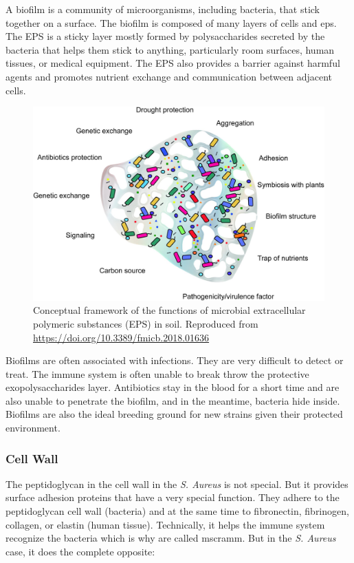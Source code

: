 
A biofilm is a community of microorganisms, including bacteria, that stick together on a surface. The biofilm is composed of many layers of cells and \gls{eps}. The EPS is a sticky layer mostly formed by polysaccharides secreted by the bacteria that helps them stick to anything, particularly room surfaces, human tissues, or medical equipment. The EPS also provides a barrier against harmful agents and promotes nutrient exchange and communication between adjacent cells.

    \begin{figure}[h!]
        \centering
            \includegraphics[width=0.7\linewidth]{figures/Staph/fmicb-09-01636-g001.jpg } 
        \caption{Conceptual framework of the functions of microbial extracellular polymeric substances (EPS) in soil. Reproduced from \url{https://doi.org/10.3389/fmicb.2018.01636}}
        \label{figure:EPS}
    \end{figure}

Biofilms are often associated with infections. They are very difficult to detect or treat. The immune system is often unable to break throw the protective exopolysaccharides layer. Antibiotics stay in the blood for a short time and are also unable to penetrate the biofilm, and in the meantime, bacteria hide inside. Biofilms are also the ideal breeding ground for new strains given their protected environment.

\subsubsection{Cell Wall}

The peptidoglycan in the cell wall in the \textit{S. Aureus} is not special. But it provides surface adhesion proteins that have a very special function. They adhere to the peptidoglycan cell wall (bacteria) and at the same time to fibronectin, fibrinogen, collagen, or elastin (human tissue). Technically, it helps the immune system recognize the bacteria which is why are called \gls{mscramm}. But in the \textit{S. Aureus} case, it does the complete opposite:

